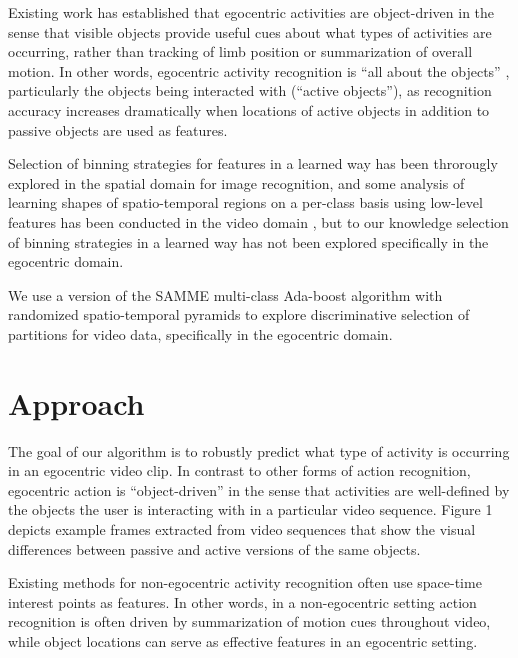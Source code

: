 \documentclass{bmvc2k}
\begin{document}
  Existing work has established that egocentric activities are object-driven
  in the sense that visible objects provide useful cues about what types of
  activities are occurring, rather than tracking of limb position or
  summarization of overall motion. In other words,
	egocentric activity recognition is ``all about
  the objects'' \cite{Ramanan12}, particularly the objects being interacted
  with (``active objects''), as
	recognition accuracy increases dramatically when locations of active
  objects in addition to passive objects are used as features. 




  Selection of binning strategies for features in a learned way has been throrougly explored in the
  spatial domain \cite{Sharma11, Jiang12} for image recognition, and some
  analysis of learning shapes of spatio-temporal regions on a per-class
  basis using low-level features has been conducted in the video domain \cite{Kovashka10}, but to
  our knowledge selection of binning strategies in a learned way has not
  been explored specifically in the egocentric domain.
  
	
  
	We use a version of the SAMME multi-class Ada-boost algorithm \cite{Zhu06}
  with randomized spatio-temporal pyramids to explore discriminative
  selection of partitions for video data, specifically in the egocentric
  domain.

\section{Approach}
  The goal of our algorithm is to robustly predict what type of activity is occurring in
  an egocentric video clip. In contrast to other forms of action
  recognition, egocentric action is ``object-driven'' in the sense that
  activities are well-defined by the objects the user is interacting with in
  a particular video sequence. Figure 1 depicts example frames extracted from
  video sequences that show the visual differences between passive and
  active versions of the same objects.
  
  Existing methods for non-egocentric activity
  recognition often use space-time interest points \cite{Laptev03} as features. In other
  words, in a non-egocentric setting action recognition is often driven by
  summarization of motion cues throughout video, while object locations can
  serve as effective features in an egocentric setting.
\end{document}
